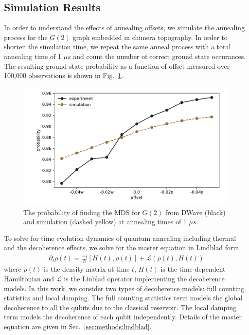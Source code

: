 \documentclass[prd,twocolumn,tightenlines,preprintnumbers,showpacs,superscriptaddress,notitlepage,nofootinbib,eqsecnum,floatfix,longbibliography,aps,10pt]{revtex4-2}
\begin{document}
\subsection{Simulation Results}
\label{sec:results:simulation}
In order to understand the effects of annealing offsets, we simulate the annealing process for the $G(2)$ graph embedded in chimera topography.
In order to shorten the simulation time, we repeat the same anneal process with a total annealing time of 1 $\mu s$ and count the number of correct ground state occurances.
The resulting ground state probability as a function of offset measured over 100,000 observations is shown in Fig.~\ref{fig:dwave1us}.

\begin{figure}[b]
	\centering
	\includegraphics[width=\columnwidth]{./new_figures/NN2_offset_scaling.pdf}
	\caption{The probability of finding the MDS for $G(2)$ from DWave (black) and simulation (dashed yellow) at annealing times of 1 $\mu s$.}
	\label{fig:dwave1us}
\end{figure}


To solve for time evolution dynamics of quantum annealing including thermal and the decoherence effects, we solve for the master equation in Lindblad form
\begin{align}
 \partial_t \rho (t) =  \frac{-i}{\hbar} [H(t) , \rho(t)] + \mathcal{L}(\rho(t), H(t))
\end{align}
where $\rho (t)$ is the density matrix at time $t$, $H(t)$ is the time-dependent Hamiltonian and $\mathcal{L}$ is the Linblad operator implementing the decoherence models.
In this work, we consider two types of decoherence models: full counting statistics and local damping. \cite{10.5555/1972505}
The full counting statistics term models the global decoherence to all the qubits due to the classical reservoir.
The local damping term models the decoherence of each qubit independently.
Details of the master equation are given in Sec.~\ref{sec:methods:lindblad}.
\end{document}
